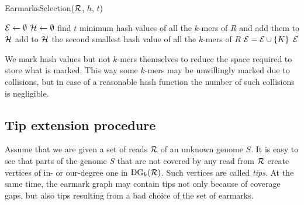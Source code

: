 \documentclass[17pt]{extarticle}
\theoremstyle{definition}
\begin{document}
\begin{multicols}{2}

\begin{algorithm}
\caption{EarmarksSelection(${\cal R}$, $h$, $t$)}
\label{alg:earmarksselection}
\begin{algorithmic}[1] %
  \STATE ${\cal E} \gets \emptyset$ 
  \STATE ${\cal H} \gets \emptyset$ 
    \STATE find $t$ minimum hash values of all the $k$-mers of $R$ and 
    add them to ${\cal H}$
  \ENDFOR
      \STATE add to ${\cal H}$ the second smallest hash value of all the 
      $k$-mers of $R$
    \ENDFOR
  \ENDIF
        \STATE ${\cal E} = {\cal E} \cup \{K\}$
      \ENDIF
    \ENDFOR
  \ENDFOR
  \RETURN ${\cal E}$
\end{algorithmic}
\end{algorithm}

We mark hash values but not $k$-mers themselves to reduce the space 
required to store what is marked. This way some $k$-mers may be unwillingly marked due 
to collisions, but in case of a reasonable hash function the number of 
such collisions is negligible.


\subsection{Tip extension procedure}
Assume that we are given a set of reads ${\cal R}$ of an unknown genome $S$.
It is easy to see that parts of the genome $S$ that are not covered by any read
from ${\cal R}$ create vertices of in- or our-degree one in $\textrm{DG}_k({\cal R})$.
Such vertices are called \emph{tips}. At the same time, the earmark graph may contain
tips not only because of coverage gaps, but also tips resulting from a bad choice of the 
set of earmarks. 


\end{multicols}
\end{document}
